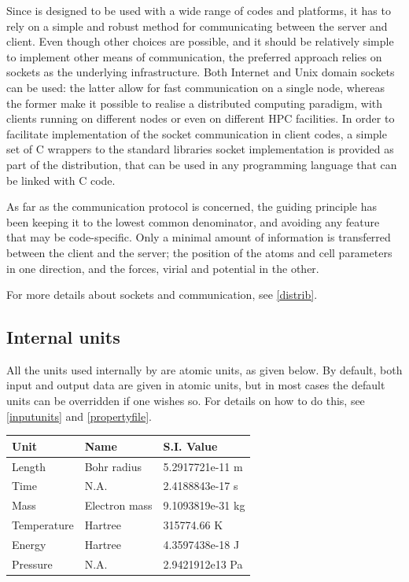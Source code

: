 \documentclass[11pt,english,fleqn]{report}
\begin{document}
Since \ipi is designed to be used with a wide range of codes and
platforms, it has to rely on a simple and robust method for communicating
between the server and client. Even though other choices are possible,
and it should be relatively simple to implement other means of communication,
the preferred approach relies on sockets as the underlying infrastructure.
Both Internet and Unix domain sockets can be used: the latter allow
for fast communication on a single node, whereas the former make
it possible to realise a distributed computing paradigm, with clients
running on different nodes or even on different HPC facilities. In
order to facilitate implementation of the socket communication in
client codes, a simple set of C wrappers to the standard libraries
socket implementation is provided as part of the \ipi distribution,
that can be used in any programming language that can be linked with
C code.

As far as the communication protocol is concerned, the guiding principle
has been keeping it to the lowest common denominator, and avoiding
any feature that may be code-specific. Only a minimal amount of information
is transferred between the client and the server; the position of
the atoms and cell parameters in one direction, and the forces, virial
and potential in the other.

For more details about sockets and communication, see \ref{distrib}. 


\subsection{Internal units}

\label{units}

All the units used internally by \ipi are atomic units, as given
below. By default, both input and output data are given in atomic
units, but in most cases the default units can be overridden if one
wishes so. For details on how to do this, see \ref{inputunits} and
\ref{propertyfile}.

\begin{center}
\begin{tabular}{lll}
\hline\hline
Unit & Name & S.I. Value\\
\hline 
Length & Bohr radius & 5.2917721e-11 m\\
Time & N.A. & 2.4188843e-17 s\\
Mass & Electron mass & 9.1093819e-31 kg\\
Temperature & Hartree & 315774.66 K\\
Energy & Hartree & 4.3597438e-18 J\\
Pressure & N.A. & 2.9421912e13 Pa\\
\hline\hline
\end{tabular}
\par\end{center}
\end{document}

